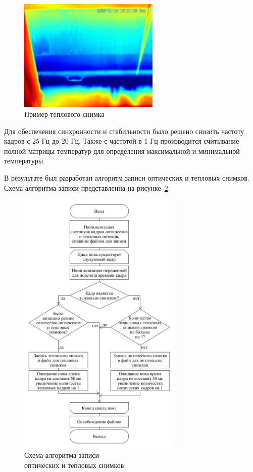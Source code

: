 \documentclass[14pt, a4paper]{extreport}
\begin{document}
	\begin{figure}[h!]
		\centering
		\includegraphics[width = 0.6\textwidth]{image/chapter_2/tep_example}	
		\caption{Пример теплового снимка}
		\label{fig:tep_example}
	\end{figure}
	Для обеспечения синхронности и стабильности было решено снизить частоту кадров с 25 Гц до 20 Гц. Также с частотой в 1 Гц производится считывание полной матрицы температур для определения максимальной и минимальной температуры. 
	
	В результате был разработан алгоритм записи оптических и тепловых снимков. Схема алгоритма записи представленна на рисунке~\ref{fig:loaddata}.
	
	\begin{figure}[h!]
		\centering
		\includegraphics[width = 0.7\textwidth]{image/chapter_2/loaddata}	
		\caption{Схема алгоритма записи\\ оптических и тепловых снимков}
		\label{fig:loaddata}
	\end{figure}
	
\end{document}
